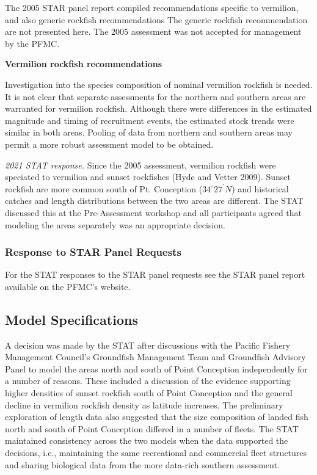 \documentclass[
  english,
  a4paper,
]{article}
\begin{document}
The 2005 STAR panel report compiled recommendations specific to vermilion, and also
generic rockfish recommendations The generic rockfish recommendation are not
presented here. The 2005 assessment was not accepted for management by the PFMC.

\textbf{Vermilion rockfish recommendations}

Investigation into the species composition of nominal vermilion rockfish is needed.
It is not clear that separate assessments for the northern and southern areas are warranted
for vermilion rockfish. Although there were differences in the estimated magnitude and
timing of recruitment events, the estimated stock trends were similar in both areas.
Pooling of data from northern and southern areas may permit a more robust assessment
model to be obtained.

\emph{2021 STAT response.} Since the 2005 assessment, vermilion rockfish were speciated
to vermilion and sunset rockfishes (Hyde and Vetter 2009). Sunset rockfish are more common south of
Pt. Conception ($34^\circ 27^\prime N$) and historical catches and length distributions between
the two areas are different. The STAT discussed this at the Pre-Assessment workshop
and all participants agreed that modeling the areas separately was an appropriate
decision.

\hypertarget{response-to-star-panel-requests}{%
\subsubsection{Response to STAR Panel Requests}\label{response-to-star-panel-requests}}

For the STAT responses to the STAR panel requests see the STAR panel report available
on the PFMC's website.

\hypertarget{model-specifications}{%
\subsection{Model Specifications}\label{model-specifications}}

A decision was made by the STAT after discussions with the Pacific Fishery Management Council's Groundfish Management Team and Groundfish Advisory Panel to model the areas north and south of Point Conception independently for a number of reasons. These included a discussion of the evidence supporting higher densities of sunset rockfish south of Point Conception and the general decline in vermilion rockfish density as latitude increases. The preliminary exploration of length data also suggested that the size composition of landed fish north and south of Point Conception differed in a number of fleets. The STAT maintained consistency across the two models when the data supported the decisions, i.e., maintaining the same recreational and commercial fleet structures and sharing biological data from the more data-rich southern assessment.
\end{document}
